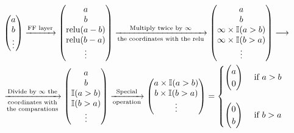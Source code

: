 \begin{align*}
    & \left( \begin{matrix} a \\ b \\ \vdots \\ \end{matrix} \right) 
    \xrightarrow{\text{FF layer}}
    \left( \begin{matrix} a \\ b \\ \text{relu}(a-b) \\ \text{relu}(b-a) \\ \vdots \\ \end{matrix} \right) 
    \xrightarrow[\text{the coordinates with the relu}]{\text{Multiply twice by $\infty$}}
    \left( \begin{matrix} a \\ b \\ \infty \times \mathbb{I}(a>b) \\ \infty \times \mathbb{I}(b>a) \\ \vdots \\ \end{matrix} \right) \longrightarrow 
    \\
    & \xrightarrow[\text{\text{\shortstack{coordinates with \\ the comparations}}}]{\text{Divide by $\infty$ the}}
    \left( \begin{matrix} a \\ b \\ \mathbb{I}(a>b) \\ \mathbb{I}(b>a) \\ \vdots \\ \end{matrix} \right)
    \xrightarrow[\text{operation}]{\text{Special}}
    \left( \begin{matrix} a \times \mathbb{I}(a>b) \\ b \times \mathbb{I}(b>a) \\ \vdots \\ \end{matrix} \right)
    = \begin{cases}
        \left( \begin{matrix} a \\ 0 \\ \end{matrix} \right) & \text{ if } a > b \\
        \\
        \left( \begin{matrix} 0 \\ b \\ \end{matrix} \right) & \text{ if } b > a 
    \end{cases}
\end{align*}


